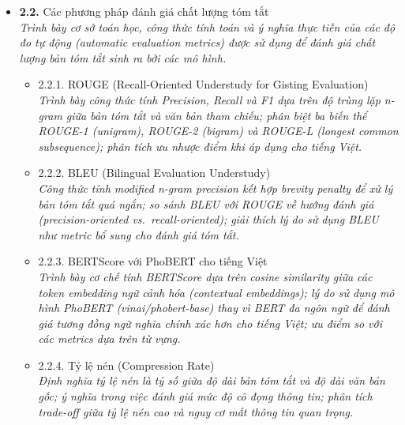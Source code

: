 \documentclass[a4paper,12pt]{article}
\begin{document}
\begin{itemize}[leftmargin=1cm, labelsep=0.3cm, itemsep=1pt, label={}]
  \item \textbf{2.2.} Các phương pháp đánh giá chất lượng tóm tắt \\
  {\small\itshape Trình bày cơ sở toán học, công thức tính toán và ý nghĩa thực tiễn của các độ đo tự động (automatic evaluation metrics) được sử dụng để đánh giá chất lượng bản tóm tắt sinh ra bởi các mô hình.}
  \begin{itemize}[leftmargin=1cm, itemsep=0pt, label={}]
    \item 2.2.1. ROUGE (Recall-Oriented Understudy for Gisting Evaluation) \\
      {\small\itshape Trình bày công thức tính Precision, Recall và F1 dựa trên độ trùng lặp n-gram giữa bản tóm tắt và văn bản tham chiếu; phân biệt ba biến thể ROUGE-1 (unigram), ROUGE-2 (bigram) và ROUGE-L (longest common subsequence); phân tích ưu nhược điểm khi áp dụng cho tiếng Việt.}
    \item 2.2.2. BLEU (Bilingual Evaluation Understudy) \\
      {\small\itshape Công thức tính modified n-gram precision kết hợp brevity penalty để xử lý bản tóm tắt quá ngắn; so sánh BLEU với ROUGE về hướng đánh giá (precision-oriented vs.\ recall-oriented); giải thích lý do sử dụng BLEU như metric bổ sung cho đánh giá tóm tắt.}
    \item 2.2.3. BERTScore với PhoBERT cho tiếng Việt \\
      {\small\itshape Trình bày cơ chế tính BERTScore dựa trên cosine similarity giữa các token embedding ngữ cảnh hóa (contextual embeddings); lý do sử dụng mô hình PhoBERT (vinai/phobert-base) thay vì BERT đa ngôn ngữ để đánh giá tương đồng ngữ nghĩa chính xác hơn cho tiếng Việt; ưu điểm so với các metrics dựa trên từ vựng.}
    \item 2.2.4. Tỷ lệ nén (Compression Rate) \\
      {\small\itshape Định nghĩa tỷ lệ nén là tỷ số giữa độ dài bản tóm tắt và độ dài văn bản gốc; ý nghĩa trong việc đánh giá mức độ cô đọng thông tin; phân tích trade-off giữa tỷ lệ nén cao và nguy cơ mất thông tin quan trọng.}
  \end{itemize}


\end{itemize}
\end{document}
